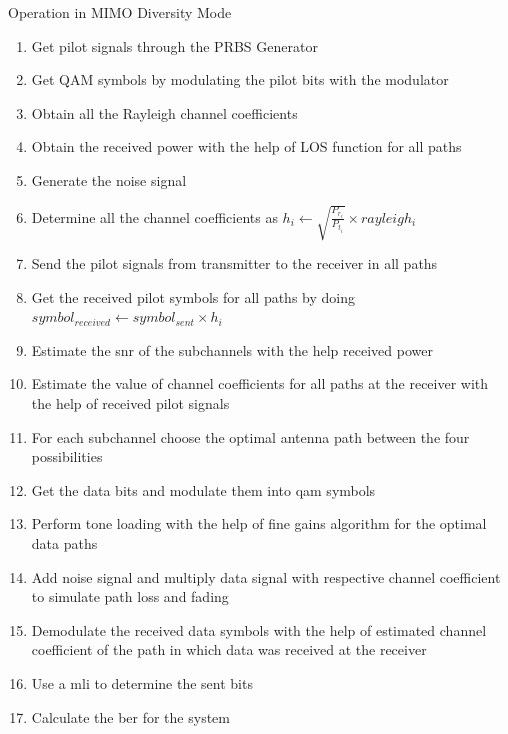 \begin{algorithm}[!htbp]
\caption{Operation in MIMO Diversity Mode}
\label{alg:Operation in MIMO Diversity Mode}
\begin{enumerate}
\item Get pilot signals through the PRBS Generator
\item Get QAM symbols by modulating the pilot bits with the modulator
\item Obtain all the Rayleigh channel coefficients
\item Obtain the received power with the help of LOS function for all  paths
\item Generate the noise signal
\item Determine all the channel coefficients as $h_i \gets \sqrt{\frac{P_{r_i}}{P_{t_i}}} \times rayleigh_i$
\item Send the pilot signals from transmitter to the receiver in all paths
\item Get the received pilot symbols for all paths by doing $symbol_{received} \gets symbol_{sent} \times h_i$
\item Estimate the \acrshort{snr} of the subchannels with the help received power
\item Estimate the value of channel coefficients for all paths at the receiver with the help of received pilot signals
\item For each subchannel choose the optimal antenna path between the four possibilities
\item Get the data bits and modulate them into \acrshort{qam} symbols
\item Perform tone loading with the help of fine gains algorithm for the optimal data paths
\item Add noise signal and multiply data signal with respective channel coefficient to simulate path loss and fading
\item Demodulate the received data symbols with the help of estimated channel coefficient of the path in which data was received at the receiver
\item Use a \acrlong{mli} to determine the sent bits
\item Calculate the \acrshort{ber} for the system
\end{enumerate}
\end{algorithm} 

